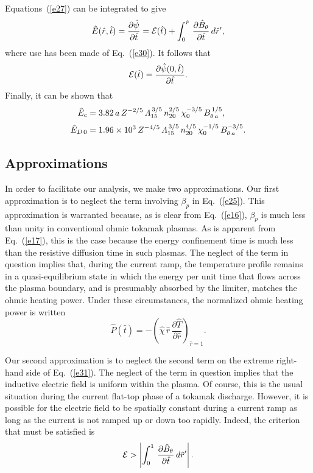 \documentclass[12pt,prb,aps]{revtex4-1}
\begin{document}
 Equations~(\ref{e27}) can be integrated to give
 \begin{equation}\label{e31}
 \hat{E}(\hat{r},\hat{t})= \frac{\partial\hat{\psi}}{\partial \hat{t}}={\cal E}(\hat{t})+\int_0^{\hat{r}}\,\frac{\partial\hat{B}_\theta}{\partial\hat{t}}\,d\hat{r}',
 \end{equation}
 where use has been made of Eq.~(\ref{e30}). It follows that 
 \begin{equation}
 {\cal E}(\hat{t}) = \frac{\partial\hat{\psi}(0,\hat{t})}{\partial\hat{t}}.
 \end{equation}
 Finally, it can be shown that
 \begin{align}
 \hat{E}_c&= 3.82\,a\,Z^{-2/5}\,{\mit\Lambda}_{15}^{\,3/5}\,n_{20}^{2/5}\,\chi_0^{-3/5}\,B_{\theta\,a}^{\,1/5},\\[0.5ex]
 \hat{E}_{D\,0} &= 1.96\times 10^3\,Z^{-4/5}\,{\mit\Lambda}_{15}^{\,3/5}\,n_{20}^{4/5}\,\chi_0^{-1/5}\,B_{\theta\,a}^{-3/5}.
 \end{align}
 
\subsection{Approximations}

In order to facilitate our analysis, we make two approximations. 
Our first approximation is to neglect the term involving $\beta_p$ in Eq.~(\ref{e25}).
This approximation is warranted because, as is clear from Eq.~(\ref{e16}), $\beta_p$ is much less than unity in  conventional ohmic
tokamak plasmas. As is apparent from Eq.~(\ref{e17}), this is the case because the energy confinement time is much less than
the resistive diffusion time in such plasmas. The neglect of the term in question implies that, during the current ramp,  the temperature profile remains in a quasi-equilibrium state in which
the energy per unit time that flows across the plasma boundary, and is presumably absorbed by the limiter, matches the ohmic heating power. Under these
circumstances, the normalized ohmic heating power is written
\begin{equation}\label{e36}
\hat{P}(\hat{t}) = - \left(\hat{\chi}\,\hat{r}\,\frac{\partial\hat{T}}{\partial\hat{r}}\right)_{\hat{r}=1}.
\end{equation}

Our second approximation is to neglect the second term on the extreme right-hand side of Eq.~(\ref{e31}). The neglect of the term in question implies that
the inductive electric field is uniform within the plasma. Of course, this is the usual situation during the current flat-top phase of a tokamak
discharge. However, it is possible for the electric field to be spatially constant during a current ramp as long as the current is not ramped up or down too
rapidly. Indeed, the criterion that must be satisfied is
\begin{equation}\label{e35}
{\cal E} >\left| \int_0^{1}\,\frac{\partial\hat{B}_\theta}{\partial\hat{t}}\,d\hat{r}'\right|.
\end{equation}
\end{document}
